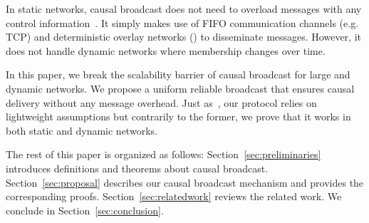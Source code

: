 In static networks, causal broadcast does not need to overload messages with any
control information~\cite{friedman2004causal}. It simply makes use of FIFO
communication channels (e.g. TCP) and deterministic overlay networks (\REF) to
disseminate messages. However, it does not handle dynamic networks where
membership changes over time.

In this paper, we break the scalability barrier of causal broadcast for large
and dynamic networks. We propose a uniform reliable broadcast that ensures
causal delivery without any message overhead. Just as~\cite{friedman2004causal},
our protocol relies on lightweight assumptions but contrarily to the former, we
prove that it works in both static and dynamic networks.


The rest of this paper is organized as follows: Section~\ref{sec:preliminaries}
introduces definitions and theorems about causal
broadcast. Section~\ref{sec:proposal} describes our causal broadcast mechanism
and provides the corresponding proofs. Section~\ref{sec:relatedwork} reviews the
related work. We conclude in Section~\ref{sec:conclusion}.




